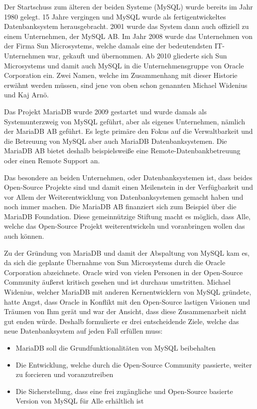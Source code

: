 
Der Startschuss zum älteren der beiden Systeme (MySQL) wurde bereits im Jahr 1980 gelegt. 15 Jahre vergingen und MySQL wurde als fertigentwickeltes Datenbanksystem herausgebracht. 2001 wurde das System dann auch offiziell zu einem Unternehmen, der MySQL AB. Im Jahr 2008 wurde das Unternehmen von der Firma Sun Microsystems, welche damals eine der bedeutendsten IT-Unternehmen war, gekauft und übernommen. Ab 2010 gliederte sich Sun Microsystems und damit auch MySQL in die Unternehmensgruppe von Oracle Corporation ein. Zwei Namen, welche im Zusammenhang mit dieser Historie erwähnt werden müssen, sind jene von oben schon genannten Michael Widenius und Kaj Arnö.

Das Projekt MariaDB wurde 2009 gestartet und wurde damals als Systemunterzweig von MySQL geführt, aber als eigenes Unternehmen, nämlich der MariaDB AB geführt. Es legte primäre den Fokus auf die Verwaltbarkeit und die Betreuung von MySQL aber auch MariaDB Datenbanksystemen. Die MariaDB AB bietet deshalb beispielsweiße eine Remote-Datenbankbetreuung oder einen Remote Support an.

Das besondere an beiden Unternehmen, oder Datenbanksystemen ist, dass beides Open-Source Projekte sind und damit einen Meilenstein in der Verfügbarkeit und vor Allem der Weiterentwicklung von Datenbanksystemen gemacht haben und noch immer machen. Die MariaDB AB finanziert sich zum Beispiel über die MariaDB Foundation. Diese gemeinnützige Stiftung macht es möglich, dass Alle, welche das Open-Source Projekt weiterentwickeln und voranbringen wollen das auch können.

Zu der Gründung von MariaDB und damit der Abspaltung von MySQL kam es, da sich die geplante Übernahme von Sun Microsystems durch die Oracle Corporation abzeichnete. Oracle wird von vielen Personen in der Open-Source Community äußerst kritisch gesehen und ist durchaus umstritten. Michael Widenius, welcher MariaDB mit anderen Kernentwicklern von MySQL gründete, hatte Angst, dass Oracle in Konflikt mit den Open-Source lastigen Visionen und Träumen von Ihm gerät und war der Ansicht, dass diese Zusammenarbeit nicht gut enden würde. Deshalb formulierte er drei entscheidende Ziele, welche das neue Datenbanksystem auf jeden Fall erfüllen muss:

\begin{itemize}
    \item MariaDB soll die Grundfunktionalitäten von MySQL beibehalten
    \item Die Entwicklung, welche durch die Open-Source Community passierte, weiter zu forcieren und voranzutreiben
    \item Die Sicherstellung, dass eine frei zugängliche und Open-Source basierte Version von MySQL für Alle erhältlich ist
\end{itemize}
